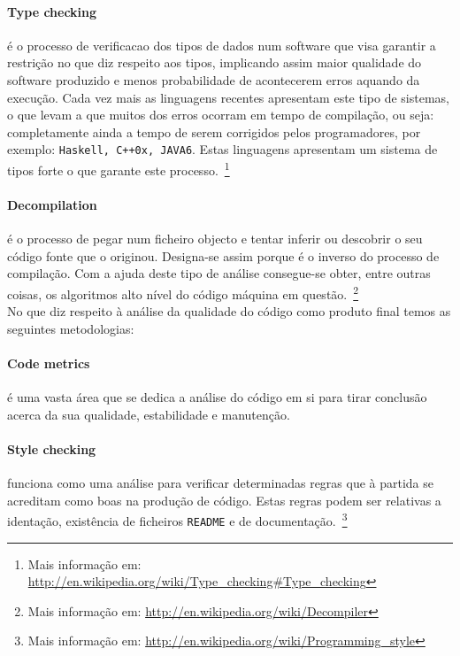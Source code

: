 \paragraph{Type checking}é o processo de verificacao dos tipos de dados num software que visa garantir a restrição 
no que diz respeito aos tipos, implicando assim maior qualidade do software produzido e menos probabilidade de acontecerem erros aquando da execução. 
Cada vez mais as linguagens recentes apresentam este tipo de sistemas, o que levam a que muitos dos erros ocorram em tempo de compilação, ou seja: 
completamente ainda a tempo de serem corrigidos pelos programadores, por exemplo: \texttt{Haskell, C++0x, JAVA6}. 
Estas linguagens apresentam um sistema de tipos forte o que garante este processo.~\footnote{Mais informação em: \url{http://en.wikipedia.org/wiki/Type_checking\#Type_checking}}

\paragraph{Decompilation} é o processo de pegar num ficheiro objecto e tentar inferir ou descobrir o seu código fonte que o originou. 
Designa-se assim porque é o inverso do processo de compilação. 
Com a ajuda deste tipo de análise consegue-se obter, entre outras coisas, os algoritmos alto nível do código máquina em questão.~\footnote{Mais informação em: \url{http://en.wikipedia.org/wiki/Decompiler}}\\

No que diz respeito à análise da qualidade do código como produto final temos as seguintes metodologias:

\paragraph{Code metrics} é uma vasta área que se dedica a análise do código em si para tirar conclusão acerca da sua qualidade, estabilidade e manutenção.

\paragraph{Style checking} funciona como uma análise para verificar determinadas regras que à partida se acreditam como boas na produção de código. 
Estas regras podem ser relativas a identação,  existência de ficheiros \texttt{README} e de documentação.~\footnote{Mais informação em: \url{http://en.wikipedia.org/wiki/Programming_style}}

